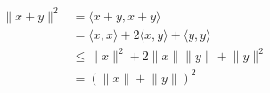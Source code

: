 \documentclass[preview]{standalone}
\begin{document}
\begin{align*}
\lVert x + y \rVert ^{2} & = \langle x+y, x+y \rangle \\& = \langle x, x \rangle + 2\langle x, y \rangle + \langle y, y \rangle \\& \leq \lVert x \rVert ^{2} + 2 \lVert x \rVert \lVert y \rVert + \lVert  y \rVert ^{2} \\&  = (\lVert x \rVert + \lVert  y \rVert)^{2}
\end{align*}
\end{document}
